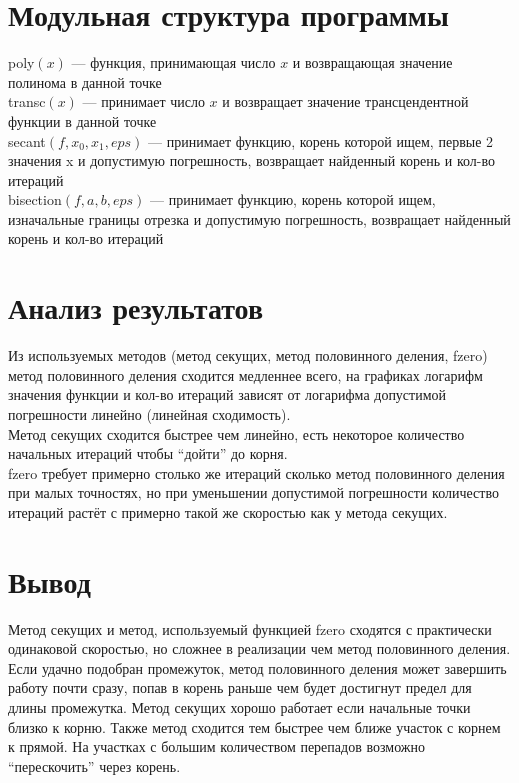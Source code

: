\documentclass[a4paper]{article}
\begin{document}
\section{Модульная структура программы}
poly$(x)$ --- функция, принимающая число $x$ и возвращающая значение полинома в данной точке\\
transc$(x)$ --- принимает число $x$ и возвращает значение трансцендентной функции в данной точке\\
secant$(f, x_0, x_1, eps)$ --- принимает функцию, корень которой ищем, первые 2 значения x и допустимую погрешность, возвращает найденный корень и кол-во итераций\\
bisection$(f, a, b, eps)$ --- принимает функцию, корень которой ищем, изначальные границы отрезка и допустимую погрешность, возвращает найденный корень и кол-во итераций\\
\section{Анализ результатов}
Из используемых методов (метод секущих, метод половинного деления, fzero) метод половинного деления сходится медленнее всего, на графиках логарифм значения функции и кол-во итераций зависят от логарифма допустимой погрешности
линейно (линейная сходимость).\\
Метод секущих сходится быстрее чем линейно, есть некоторое количество начальных итераций чтобы ``дойти'' до корня.\\
fzero требует примерно столько же итераций сколько метод половинного деления при малых точностях, но при уменьшении допустимой погрешности количество итераций растёт с примерно такой же скоростью как у метода секущих.
\section{Вывод}
Метод секущих и метод, используемый функцией fzero сходятся с практически одинаковой скоростью, но сложнее в реализации чем метод половинного деления.\\
Если удачно подобран промежуток, метод половинного деления может завершить работу почти сразу, попав в корень раньше чем будет достигнут предел для длины промежутка.
Метод секущих хорошо работает если начальные точки близко к корню. Также метод сходится тем быстрее чем ближе участок с корнем к прямой. На участках с большим количеством перепадов возможно ``перескочить'' через корень.
\end{document}

